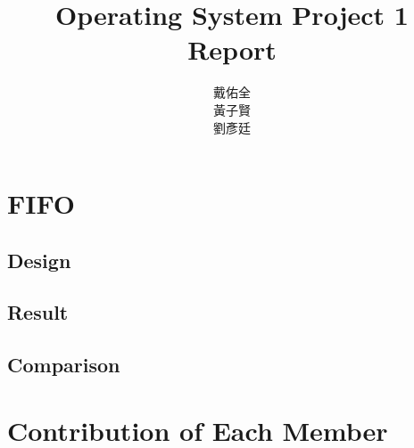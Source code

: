 \documentclass{article}
\title{Operating System Project 1\\Report}
\author{戴佑全\\黃子賢\\劉彥廷}
\begin{document}
\begin{CJK}{UTF8}{bkai}
\maketitle
\end{CJK}

\section{FIFO}
\subsection{Design}
\subsection{Result}
\subsection{Comparison}

\section{Contribution of Each Member}
\end{document}
